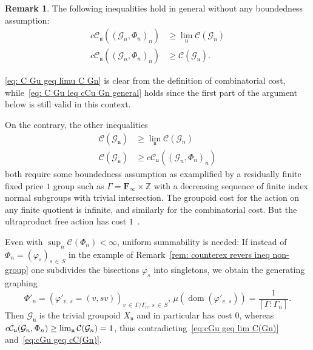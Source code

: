 \documentclass[10pt]{amsart}
\theoremstyle{definition}
\newtheorem{rema}[cdrthm]{Remark}
\newcommand{\Zmath}{\mathbb{Z}}
\newcommand{\FF}{\mathbf{F}}
\newcommand{\cost}{\mathcal{C}}
\newcommand{\ccost}{c\mathcal{C}}
\newcommand{\cg}{\mathcal{G}}
\DeclareMathOperator{\dom}{dom}
\newcommand{\ul}{\mathfrak{u}}
\newcommand{\ph}{\varphi}
\begin{document}
\begin{rema}\label{rem: counterex revers ineq non bounded}
The following inequalities hold in general without any boundedness assumption:
\begin{align}\label{eq: C Gu geq limu C Gn}
\ccost_\ul((\cg_n,\Phi_n)_n) &\geq \lim_\ul\cost(\cg_n)\\\label{eq: C Gu leq cCu Gn general}
\ccost_\ul((\cg_n,\Phi_n)_n) &\geq \cost(\cg_\ul).
\end{align}

\eqref{eq: C Gu geq limu C Gn} is clear from the definition of combinatorial cost, while~\eqref{eq: C Gu leq cCu Gn general} holds since the first part of the argument below is still valid in this context.

On the contrary, the other inequalities
\begin{align}
\cost(\cg_\ul) &\geq \lim\limits_\ul \cost(\cg_n)\label{eq:cGu geq lim C(Gn)}
\\
\cost(\cg_\ul) &\geq \ccost_\ul((\cg_n,\Phi_n)_n)\label{eq:cGu geq cC(Gn)}
\end{align}
both require some boundedness assumption as examplified by a residually finite fixed price $1$ group such as $\Gamma=\FF_{\infty}\times \Zmath$ with a decreasing sequence of finite index normal subgroups with trivial intersection. The groupoid cost for the action on any finite quotient is infinite, and similarly for the combinatorial cost. But the ultraproduct free action has cost $1$~\cite[Proposition~VI.23]{Gab-cost}.

Even with $\sup_n \cost(\Phi_n) < \infty$, uniform summability is needed: If instead of $\Phi_n=(\ph_s)_{s\,\in\,S}$ in the example of Remark~\ref{rem: counterex revers ineq non-group} one subdivides the bisections $\ph_s$ into singletons, we obtain the generating graphing
\[
\Phi'_n=(\ph'_{v,\,s}=(v,sv))_{v\,\in\,\Gamma/\Gamma_n,\,s\,\in\,S}, \,\mu(\dom(\ph'_{v,\,s})) = \frac {1}{ [\Gamma:\Gamma_n]}.
\]
Then $\cg_\ul$ is the trivial groupoid $X_\ul$ and in particular has cost $0$, whereas $\ccost_\ul (\cg_n,\Phi_n)\linebreak\geq \lim_\ul \cost(\cg_n) = 1$, thus contradicting~\eqref{eq:cGu geq lim C(Gn)} and~\eqref{eq:cGu geq cC(Gn)}.
\end{rema}
\end{document}
